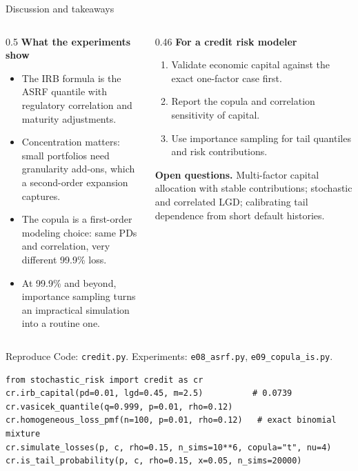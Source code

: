 \documentclass[aspectratio=169,10pt]{beamer}
\begin{document}
\begin{frame}{Discussion and takeaways}
  \small
  \begin{columns}[T]
    \begin{column}{0.5\textwidth}
      \textbf{What the experiments show}
      \begin{itemize}
        \item The IRB formula is the ASRF quantile with regulatory correlation and maturity adjustments.
        \item Concentration matters: small portfolios need granularity add-ons, which a second-order expansion captures.
        \item The copula is a first-order modeling choice: same PDs and correlation, very different 99.9\% loss.
        \item At 99.9\% and beyond, importance sampling turns an impractical simulation into a routine one.
      \end{itemize}
    \end{column}
    \begin{column}{0.46\textwidth}
      \textbf{For a credit risk modeler}
      \begin{enumerate}
        \item Validate economic capital against the exact one-factor case first.
        \item Report the copula and correlation sensitivity of capital.
        \item Use importance sampling for tail quantiles and risk contributions.
      \end{enumerate}
      \textbf{Open questions.} Multi-factor capital allocation with stable contributions; stochastic and correlated LGD; calibrating tail dependence from short default histories.
    \end{column}
  \end{columns}
\end{frame}

\begin{frame}[fragile]{Reproduce}
  \small
  Code: \texttt{credit.py}. Experiments: \texttt{e08\_asrf.py}, \texttt{e09\_copula\_is.py}.
\begin{verbatim}
from stochastic_risk import credit as cr
cr.irb_capital(pd=0.01, lgd=0.45, m=2.5)          # 0.0739
cr.vasicek_quantile(q=0.999, p=0.01, rho=0.12)
cr.homogeneous_loss_pmf(n=100, p=0.01, rho=0.12)   # exact binomial mixture
cr.simulate_losses(p, c, rho=0.15, n_sims=10**6, copula="t", nu=4)
cr.is_tail_probability(p, c, rho=0.15, x=0.05, n_sims=20000)
\end{verbatim}
\end{frame}

\deckreferences
\end{document}
